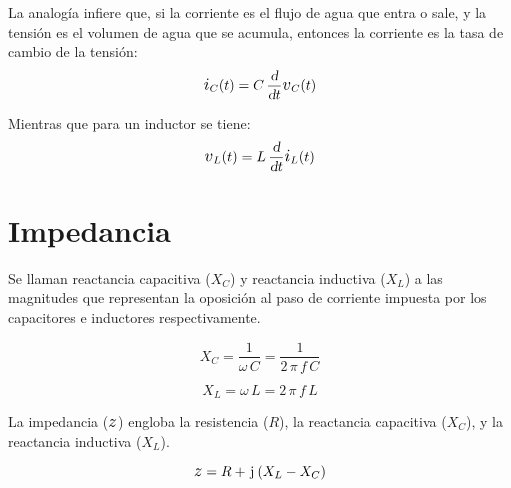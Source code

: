 La analogía infiere que, si la corriente es el flujo de agua que entra o sale, y la tensión es el volumen de agua que se acumula, entonces la corriente es la tasa de cambio de la tensión:
\begin{equation*}
    \current_C(t) = C \, \frac{\dif}{\dif t} \voltage_C(t)
\end{equation*}

Mientras que para un inductor se tiene:
\begin{equation*}
    \voltage_L(t) = L \, \frac{\dif}{\dif t} \current_L(t)
\end{equation*}


\section{Impedancia}

Se llaman reactancia capacitiva ($X_C$) y reactancia inductiva ($X_L$) a las magnitudes que representan la oposición al paso de corriente impuesta por los capacitores e inductores respectivamente.

\begin{mdframed}[style=DefinitionFrame]
    \begin{defn}
    \end{defn}
    \begin{equation*}
        X_C = \frac{1}{\omega \, C} = \frac{1}{2 \, \pi \, f \, C}
    \end{equation*}
\end{mdframed}

\begin{mdframed}[style=DefinitionFrame]
    \begin{defn}
    \end{defn}
    \begin{equation*}
        X_L = \omega \, L = 2 \, \pi \, f \, L
    \end{equation*}
\end{mdframed}

La impedancia ($\impedance$) engloba la resistencia ($R$), la reactancia capacitiva ($X_C$), y la reactancia inductiva ($X_L$).

\begin{mdframed}[style=DefinitionFrame]
    \begin{defn}
    \end{defn}
    \begin{equation*}
        \impedance = R + \iu \inParentheses{X_L - X_C}
    \end{equation*}
\end{mdframed}

